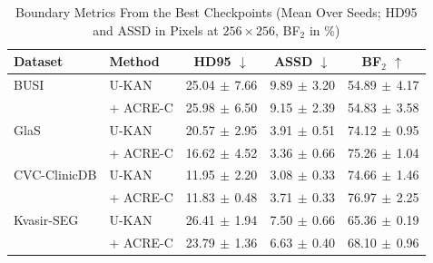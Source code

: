 \begin{table}[!t]
\caption{Boundary Metrics From the Best Checkpoints (Mean Over Seeds; HD95 and ASSD in Pixels at $256\times256$, BF$_2$ in \%)}
\label{tab:boundary}
\centering\footnotesize
\begin{tabular}{@{}llccc@{}}
\toprule
Dataset & Method & HD95 $\downarrow$ & ASSD $\downarrow$ & BF$_2$ $\uparrow$ \\
\midrule
BUSI & U-KAN & 25.04$\,\pm\,$7.66 & 9.89$\,\pm\,$3.20 & 54.89$\,\pm\,$4.17 \\
 & + ACRE-C & 25.98$\,\pm\,$6.50 & 9.15$\,\pm\,$2.39 & 54.83$\,\pm\,$3.58 \\
\addlinespace[2pt]
GlaS & U-KAN & 20.57$\,\pm\,$2.95 & 3.91$\,\pm\,$0.51 & 74.12$\,\pm\,$0.95 \\
 & + ACRE-C & 16.62$\,\pm\,$4.52 & 3.36$\,\pm\,$0.66 & 75.26$\,\pm\,$1.04 \\
\addlinespace[2pt]
CVC-ClinicDB & U-KAN & 11.95$\,\pm\,$2.20 & 3.08$\,\pm\,$0.33 & 74.66$\,\pm\,$1.46 \\
 & + ACRE-C & 11.83$\,\pm\,$0.48 & 3.71$\,\pm\,$0.33 & 76.97$\,\pm\,$2.25 \\
\addlinespace[2pt]
Kvasir-SEG & U-KAN & 26.41$\,\pm\,$1.94 & 7.50$\,\pm\,$0.66 & 65.36$\,\pm\,$0.19 \\
 & + ACRE-C & 23.79$\,\pm\,$1.36 & 6.63$\,\pm\,$0.40 & 68.10$\,\pm\,$0.96 \\
\bottomrule
\end{tabular}
\end{table}
